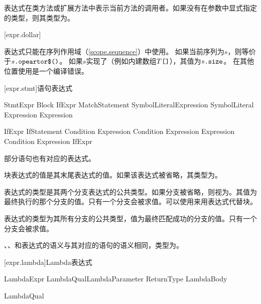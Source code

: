 \pnum
表达式在类方法或扩展方法中表示当前方法的调用者。如果没有在参数中显式指定的类型，则其类型为。

[expr.dollar]{\tcode{\$}}

\pnum
表达式\tcode{\$}只能在序列作用域（\ref{scope.sequence}）中使用。
如果当前序列为$s$，则\tcode{\$}等价于$s\texttt{.opeartor\$()}$。
如果$s$实现了（例如内建数组$T\texttt{[]}$），其值为$s\texttt{.size}$。
在其他位置使用\tcode{\$}是一个编译错误。

[expr.stmt]{语句表达式}

\begin{bnf}{StmtExpr}
    Block \br
    IfExpr \br
    MatchStatement \br
     SymbolLiteral\bnfq Expression\bnfq \br
     SymbolLiteral\bnfq \br
     Expression\bnfq \br
     Expression\bnfq
\end{bnf}

\begin{bnf}{IfExpr}
    IfStatement \br
     Condition  Expression \br
     Condition  Expression  Expression \br
     Condition  Expression  IfExpr
\end{bnf}

\pnum
部分语句也有对应的表达式。

\pnum
块表达式的值是其末尾表达式的值。如果该表达式被省略，其类型为。

\pnum
{}表达式的类型是其两个分支表达式的公共类型。如果分支被省略，则视为。其值为最终执行的那个分支的值。只有一个分支会被求值。可以使用来用表达式代替块。

\pnum
{}表达式的类型为其所有分支的公共类型，值为最终匹配成功的分支的值。只有一个分支会被求值。

\pnum
{}、、和表达式的语义与其对应的语句的语义相同，类型为。

[expr.lambda]{Lambda表达式}

\begin{bnf}{LambdaExpr}
    LambdaQual\bnfs LambdaParameter ReturnType\bnfs \terminal{=>} LambdaBody
\end{bnf}

\begin{bnf}{LambdaQual}
\end{bnf}

